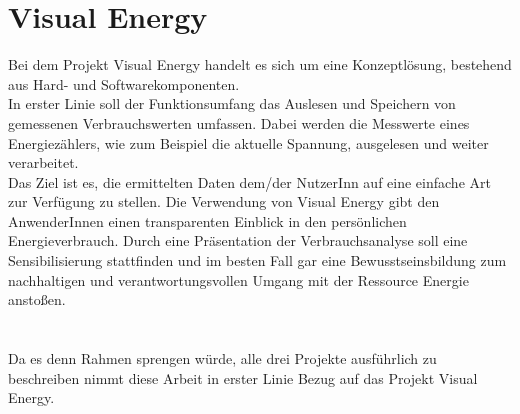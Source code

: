 \documentclass[Bachelorarbeit.tex]{subfiles}
\begin{document}
\section*{Visual Energy}
Bei dem Projekt Visual Energy handelt es sich um eine Konzeptlösung, bestehend aus Hard- und Softwarekomponenten.\\
In erster Linie soll der Funktionsumfang das Auslesen und Speichern von gemessenen Verbrauchswerten umfassen.
Dabei werden die Messwerte eines Energiezählers, wie zum Beispiel die aktuelle Spannung, ausgelesen und weiter verarbeitet.\\
Das Ziel ist es, die ermittelten Daten dem/der NutzerInn auf eine einfache Art zur Verfügung zu stellen.
Die Verwendung von Visual Energy gibt den AnwenderInnen einen transparenten Einblick in den persönlichen Energieverbrauch. 
Durch eine Präsentation der Verbrauchsanalyse soll eine Sensibilisierung stattfinden und im besten Fall gar eine Bewusstseinsbildung zum nachhaltigen und verantwortungsvollen Umgang mit der Ressource Energie anstoßen.\\
\\\\
Da es denn Rahmen sprengen würde, alle drei Projekte ausführlich zu beschreiben nimmt diese Arbeit in erster Linie Bezug auf das Projekt Visual Energy.
%
%
 
\end{document}
